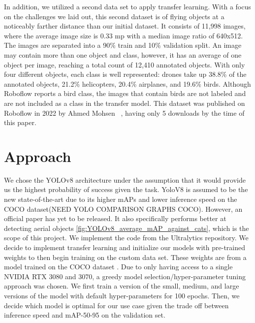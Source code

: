 \documentclass[10pt,twocolumn,letterpaper]{article}
\begin{document}
In addition, we utilized a second data set \cite{TransferDataset} to apply transfer learning. With a focus on the challenges we laid out, this second dataset is of flying objects at a noticeably farther distance than our initial dataset. It consists of 11,998 images, where the average image size is 0.33 mp with a median image ratio of 640x512. The images are separated into a 90\% train and 10\% validation split. An image may contain more than one object and class, however, it has an average of one object per image, reaching a total count of 12,410 annotated objects. With only four different objects, each class is well represented: drones take up 38.8\% of the annotated objects, 21.2\% helicopters, 20.4\% airplanes, and 19.6\% birds. Although Roboflow reports a bird class, the images that contain birds are not labeled and are not included as a class in the transfer model. This dataset was published on Roboflow in 2022 by Ahmed Mohsen ~\cite{TransferDataset}, having only 5 downloads by the time of this paper.

\section{Approach}

We chose the YOLOv8 architecture under the assumption that it would provide us the highest probability of success given the task. YoloV8 is assumed to be the new state-of-the-art due to its higher mAPs and lower inference speed on the COCO dataset(NEED YOLO COMPARISON GRAPHS COCO). However, an official paper has 
yet to be released. It also specifically performs better at detecting aerial objects \ref{fig:YOLOv8_average_mAP_against_cats}, which is the scope of this project. We implement the code from the Ultralytics repository. We decide to implement transfer learning and initialize our models with pre-trained weights to then begin training on the custom data set. These weights are from a model trained on the COCO dataset \cite{coco}. Due to only having access to a single NVIDIA RTX 3080 and 3070, a greedy model selection/hyper-parameter tuning approach was chosen. We first train a version of the small, medium, and large versions of the model with default hyper-parameters for 100 epochs. Then, we decide which model is optimal for our use case given the trade off between inference speed and mAP-50-95 on the validation set. 
\end{document}
